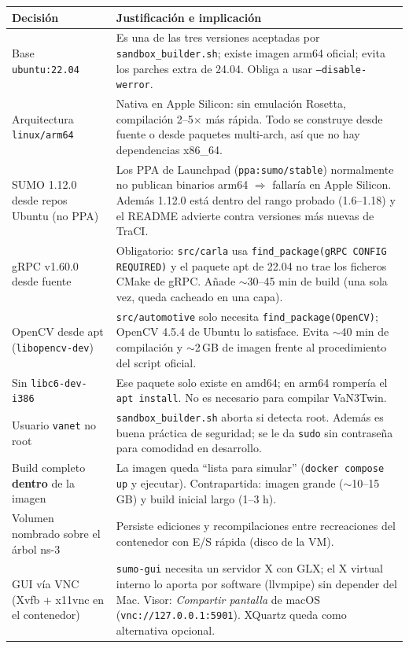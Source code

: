 \documentclass[11pt,a4paper]{article}
\begin{document}
\begin{center}
\small
\begin{tabular}{@{}p{}p{}@{}}
\toprule
\textbf{Decisi\'on} & \textbf{Justificaci\'on e implicaci\'on} \\
\midrule
Base \texttt{ubuntu:22.04} & Es una de las tres versiones aceptadas por
\texttt{sandbox\_builder.sh}; existe imagen arm64 oficial; evita los parches
extra de 24.04. Obliga a usar \texttt{--disable-werror}. \\
Arquitectura \texttt{linux/arm64} & Nativa en Apple Silicon: sin emulaci\'on
Rosetta, compilaci\'on 2--5$\times$ m\'as r\'apida. Todo se construye desde
fuente o desde paquetes multi-arch, as\'i que no hay dependencias x86\_64. \\
SUMO 1.12.0 desde repos Ubuntu (no PPA) & Los PPA de Launchpad
(\texttt{ppa:sumo/stable}) normalmente no publican binarios arm64
$\Rightarrow$ fallar\'ia en Apple Silicon. Adem\'as 1.12.0 est\'a dentro del
rango probado (1.6--1.18) y el README advierte contra versiones m\'as nuevas
de TraCI. \\
gRPC v1.60.0 desde fuente & Obligatorio: \texttt{src/carla} usa
\texttt{find\_package(gRPC CONFIG REQUIRED)} y el paquete apt de 22.04 no
trae los ficheros CMake de gRPC. A\~nade $\sim$30--45 min de build (una sola
vez, queda cacheado en una capa). \\
OpenCV desde apt (\texttt{libopencv-dev}) & \texttt{src/automotive} solo
necesita \texttt{find\_package(OpenCV)}; OpenCV 4.5.4 de Ubuntu lo satisface.
Evita $\sim$40 min de compilaci\'on y $\sim$2\,GB de imagen frente al
procedimiento del script oficial. \\
Sin \texttt{libc6-dev-i386} & Ese paquete solo existe en amd64; en arm64
romper\'ia el \texttt{apt install}. No es necesario para compilar VaN3Twin. \\
Usuario \texttt{vanet} no root & \texttt{sandbox\_builder.sh} aborta si
detecta root. Adem\'as es buena pr\'actica de seguridad; se le da
\texttt{sudo} sin contrase\~na para comodidad en desarrollo. \\
Build completo \textbf{dentro} de la imagen & La imagen queda ``lista para
simular'' (\texttt{docker compose up} y ejecutar). Contrapartida: imagen
grande ($\sim$10--15\,GB) y build inicial largo (1--3 h). \\
Volumen nombrado sobre el \'arbol ns-3 & Persiste ediciones y recompilaciones
entre recreaciones del contenedor con E/S r\'apida (disco de la VM). \\
GUI v\'ia VNC (Xvfb + x11vnc en el contenedor) & \texttt{sumo-gui} necesita
un servidor X con GLX; el X virtual interno lo aporta por software
(llvmpipe) sin depender del Mac. Visor: \emph{Compartir pantalla} de macOS
(\texttt{vnc://127.0.0.1:5901}). XQuartz queda como alternativa opcional. \\
\bottomrule
\end{tabular}
\end{center}
\end{document}
